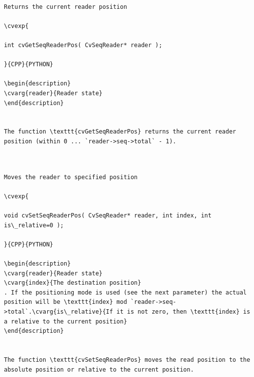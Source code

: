 \label{GetSeqReaderPos}
\begin{verbatim}

Returns the current reader position

\cvexp{

int cvGetSeqReaderPos( CvSeqReader* reader );

}{CPP}{PYTHON}

\begin{description}
\cvarg{reader}{Reader state}
\end{description}


The function \texttt{cvGetSeqReaderPos} returns the current reader position (within 0 ... `reader->seq->total` - 1).


\end{verbatim}
\label{SetSeqReaderPos}
\begin{verbatim}

Moves the reader to specified position

\cvexp{

void cvSetSeqReaderPos( CvSeqReader* reader, int index, int is\_relative=0 );

}{CPP}{PYTHON}

\begin{description}
\cvarg{reader}{Reader state}
\cvarg{index}{The destination position}
. If the positioning mode is used (see the next parameter) the actual position will be \texttt{index} mod `reader->seq->total`.\cvarg{is\_relative}{If it is not zero, then \texttt{index} is a relative to the current position}
\end{description}


The function \texttt{cvSetSeqReaderPos} moves the read position to the absolute position or relative to the current position.


\end{verbatim}
